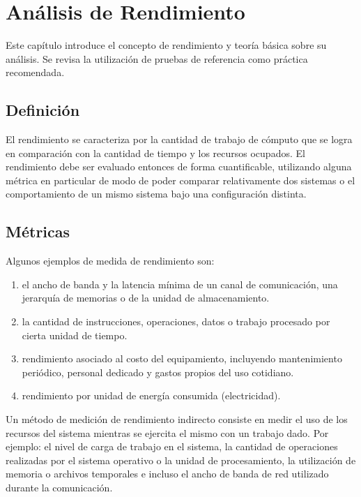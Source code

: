 \documentclass[a4paper]{report}
\begin{document}
\chapter{An\'alisis de Rendimiento}

Este cap\'itulo introduce el concepto de rendimiento y teor\'ia b\'asica sobre su an\'alisis.
Se revisa la utilizaci\'on de pruebas de referencia como pr\'actica recomendada.

\section{Definici\'on}

El rendimiento se caracteriza por la cantidad de trabajo de c\'omputo que se
logra en comparaci\'on con la cantidad de tiempo y los recursos ocupados.
El rendimiento debe ser evaluado entonces de forma cuantificable, utilizando alguna
m\'etrica en particular de modo de poder comparar relativamente dos sistemas o
el comportamiento de un mismo sistema bajo una configuraci\'on distinta.

\section{M\'etricas}

Algunos ejemplos de medida de rendimiento son:

\begin{enumerate}
\item el ancho de banda y la latencia m\'inima de un canal de comunicaci\'on,
  una jerarqu\'ia de memorias o de la unidad de almacenamiento.
\item la cantidad de instrucciones, operaciones, datos o trabajo procesado
  por cierta unidad de tiempo.
\item rendimiento asociado al costo del equipamiento, incluyendo mantenimiento
 peri\'odico, personal dedicado y gastos propios del uso cotidiano.
\item rendimiento por unidad de energ\'ia consumida (electricidad).

\end{enumerate}

Un m\'etodo de medici\'on de rendimiento indirecto consiste en medir el uso de
los recursos del sistema mientras se ejercita el mismo con un trabajo dado.
Por ejemplo: el nivel de carga de trabajo en el sistema, la cantidad de operaciones realizadas por el
sistema operativo o la unidad de procesamiento, la utilizaci\'on de memoria o
archivos temporales e incluso el ancho de banda de red utilizado durante la comunicaci\'on.
\end{document}
